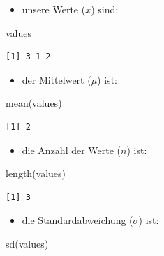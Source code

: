 \documentclass[
  letterpaper,
  DIV=11]{scrartcl}
\newenvironment{Shaded}{\begin{snugshade}}{\end{snugshade}}
\newcommand{\FunctionTok}[1]{\textcolor[rgb]{0.28,0.35,0.67}{#1}}
\newcommand{\NormalTok}[1]{\textcolor[rgb]{0.00,0.23,0.31}{#1}}
\providecommand{\tightlist}{%
  \setlength{\itemsep}{0pt}\setlength{\parskip}{0pt}}\usepackage{longtable,booktabs,array}
\begin{document}
\begin{itemize}
\tightlist
\item
  unsere Werte (\(x\)) sind:
\end{itemize}

\begin{Shaded}
\begin{Highlighting}[]
\NormalTok{values}
\end{Highlighting}
\end{Shaded}

\begin{verbatim}
[1] 3 1 2
\end{verbatim}

\begin{itemize}
\tightlist
\item
  der Mittelwert (\(\mu\)) ist:
\end{itemize}

\begin{Shaded}
\begin{Highlighting}[]
\FunctionTok{mean}\NormalTok{(values)}
\end{Highlighting}
\end{Shaded}

\begin{verbatim}
[1] 2
\end{verbatim}

\begin{itemize}
\tightlist
\item
  die Anzahl der Werte (\(n\)) ist:
\end{itemize}

\begin{Shaded}
\begin{Highlighting}[]
\FunctionTok{length}\NormalTok{(values)}
\end{Highlighting}
\end{Shaded}

\begin{verbatim}
[1] 3
\end{verbatim}

\begin{itemize}
\tightlist
\item
  die Standardabweichung (\(\sigma\)) ist:
\end{itemize}

\begin{Shaded}
\begin{Highlighting}[]
\FunctionTok{sd}\NormalTok{(values)}
\end{Highlighting}
\end{Shaded}
\end{document}
